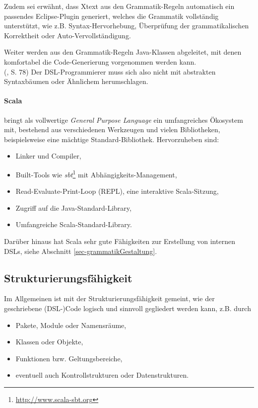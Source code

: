 Zudem sei erwähnt, dass Xtext aus den Grammatik-Regeln automatisch ein
passendes Eclipse-Plugin generiert, welches die Grammatik vollständig
unterstützt, wie z.B. Syntax-Hervorhebung, Überprüfung der grammatikalischen
Korrektheit oder Auto-Vervollständigung.

Weiter werden aus den Grammatik-Regeln Java-Klassen abgeleitet, mit denen
komfortabel die Code-Generierung vorgenommen werden kann.\\(\cite{xtext}, S. 78)
Der DSL-Programmierer
muss sich also nicht mit abstrakten Syntaxbäumen oder Ähnlichem herumschlagen.

\paragraph{Scala} bringt als vollwertige \emph{General Purpose Language}
ein umfangreiches Öko\-system mit, bestehend aus verschiedenen Werkzeugen
und vielen Bibliotheken, beispielsweise eine mächtige Standard-Bibliothek.
Hervorzuheben sind:

\begin{itemize}
  \item Linker und Compiler,
  \item Built-Tools wie \emph{sbt}\footnote{\url{http://www.scala-sbt.org}}
        mit Abhängigkeits-Management,
  \item Read-Evaluate-Print-Loop (REPL), eine interaktive Scala-Sitzung,
  \item Zugriff auf die Java-Standard-Library,
  \item Umfangreiche Scala-Standard-Library.
\end{itemize}

Darüber hinaus hat Scala sehr gute Fähigkeiten zur Erstellung von internen
DSLs, siehe Abschnitt \ref{sec-grammatikGestaltung}.


\subsection{Strukturierungsfähigkeit}\label{sec-strukturierungsfaehigkeit}

Im Allgemeinen ist mit der Strukturierungsfähigkeit gemeint, wie der
geschriebene (DSL-)Code logisch und sinnvoll gegliedert werden kann,
z.B. durch

\begin{itemize}
  \item Pakete, Module oder Namensräume,
  \item Klassen oder Objekte,
  \item Funktionen bzw. Geltungsbereiche,
  \item eventuell auch Kontrollstrukturen oder Datenstrukturen.
\end{itemize}


